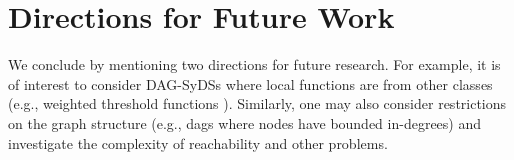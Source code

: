 \section{Directions for  Future Work}
\label{sec:concl}
 
We conclude by mentioning two directions for future research.
For example, it is of interest to consider 
DAG-SyDSs where local functions are from other classes
(e.g., weighted threshold functions \cite{Crama-Hammer-2011}).
Similarly, one may also consider restrictions
on the graph structure (e.g., dags where nodes have
bounded in-degrees) and investigate 
the complexity of reachability and other problems.


\iffalse
\noindent
\paragraph{Conclusions.}


\paragraph{Open Questions.}

\begin{itemize}
\item For DAG linear SyDSs, how long can a phase space cycle and transient be,
as a function of depth.

\item For bounded degree DAG  SyDSs, how long can a phase space cycle and transient be,
as a function of depth.

\item For various classes of Boolean functions of interest, 
how long can a phase space cycle and transient be?
(If they are polynomially bounded as a function of the number of nodes,
then reachability is polynomially solvable.)
\end{itemize}
\fi
